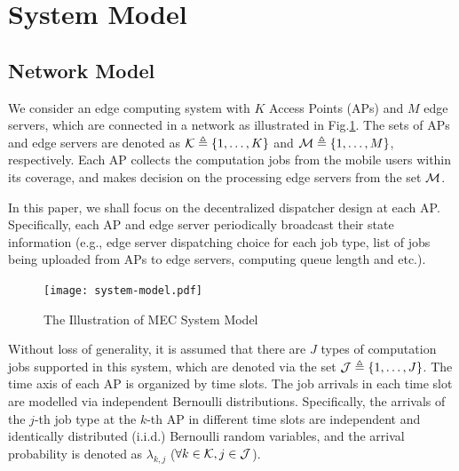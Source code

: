 \section{System Model}
\subsection{Network Model}
We consider an edge computing system with $K$ Access Points (APs) and $M$ edge servers, which are connected in a network as illustrated in Fig.\ref{fig:system}.
The sets of APs and edge servers are denoted as $\mathcal{K} \triangleq \{1,\dots,K\}$ and $\mathcal{M} \triangleq \{1,\dots,M\}$, respectively.
Each AP collects the computation jobs from the mobile users within its coverage, and makes decision on the processing edge servers from the set $\mathcal{M}$.

In this paper, we shall focus on the decentralized dispatcher design at each AP.
Specifically, each AP and edge server periodically broadcast their state information (e.g., edge server dispatching choice for each job type, list of jobs being uploaded from APs to edge servers, computing queue length and etc.).

\begin{figure}[ht]
    \centering
    \texttt{[image: system-model.pdf]}
    \caption{The Illustration of MEC System Model}
    \label{fig:system}
\end{figure}

Without loss of generality, it is assumed that there are $J$ types of computation jobs supported in this system, which are denoted via the set $\mathcal{J} \triangleq \{1,\dots,J\}$.
The time axis of each AP is organized by time slots.
The job arrivals in each time slot are modelled via independent Bernoulli distributions.
Specifically, the arrivals of the $j$-th job type at the $k$-th AP in different time slots are independent and identically distributed (i.i.d.) Bernoulli random variables, and the arrival probability is denoted as $\lambda_{k,j}$ ($\forall k\in\mathcal{K}, j\in\mathcal{J}$).

